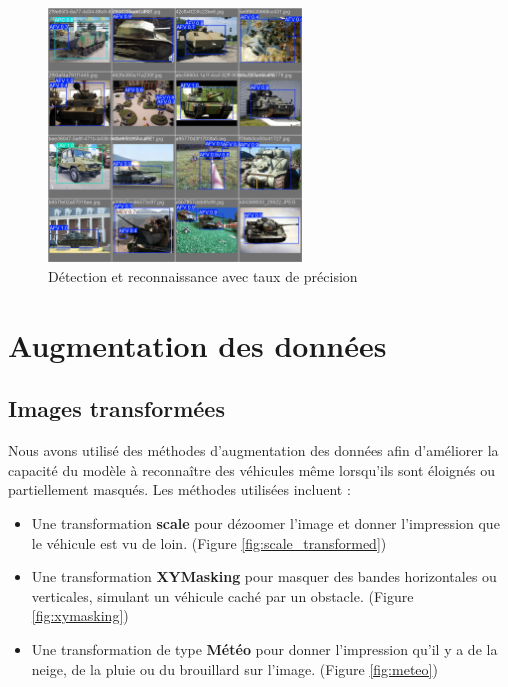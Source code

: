 \begin{figure}[H]
    \center
    \includegraphics[width=0.6\textwidth]{./images/track2_val.jpg}
    \caption[Détection et reconnaissance avec taux de précision]{Détection et reconnaissance avec taux de précision}\label{fig:track2_val}
\end{figure}


\section{Augmentation des données}

\subsection{Images transformées}

Nous avons utilisé des méthodes d'augmentation des données afin d'améliorer la capacité du modèle à reconnaître des véhicules même lorsqu'ils sont éloignés ou partiellement masqués. Les méthodes utilisées incluent :

\begin{itemize}
    \item Une transformation \textbf{scale} pour dézoomer l'image et donner l'impression que le véhicule est vu de loin. (Figure \ref{fig:scale_transformed})
    \item Une transformation \textbf{XYMasking} pour masquer des bandes horizontales ou verticales, simulant un véhicule caché par un obstacle. (Figure \ref{fig:xymasking})
    \item Une transformation de type \textbf{Météo} pour donner l'impression qu'il y a de la neige, de la pluie ou du brouillard sur l'image. (Figure \ref{fig:meteo})
\end{itemize}


